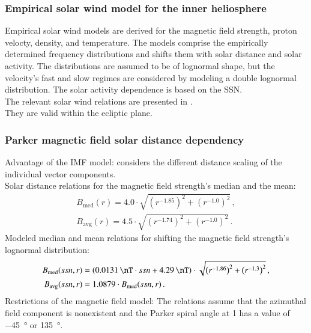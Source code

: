 \subsubsection*{Empirical solar wind model for the inner heliosphere}

Empirical solar wind models are derived for the magnetic field strength, proton velocty, density, and temperature. The models comprise the empirically determined frequency distributions and shifts them with solar distance and solar activity. The distributions are assumed to be of lognormal shape, but the velocity's fast and slow regimes are considered by modeling a double lognormal distribution. The solar activity dependence is based on the SSN.\\

The relevant solar wind relations are presented in \citet[p.~10]{Venzmer2018}.\\
They are valid within the ecliptic plane.\\


\subsubsection*{Parker magnetic field solar distance dependency}
Advantage of the IMF model: considers the different distance scaling of the individual vector components.\\

Solar distance relations for the magnetic field strength's median and the mean:
\begin{align}
	B_\text{med}(r) = 4.0 \cdot \sqrt{\left(r^{-1.85}\right)^2 + \left(r^{-1.0}\right)^2}	\,,\\
	B_\text{avg}(r) = 4.5 \cdot \sqrt{\left(r^{-1.74}\right)^2 + \left(r^{-1.0}\right)^2}	\,.
\end{align}
Modeled median and mean relations for shifting the magnetic field strength's lognormal distribution:
\begin{align}
	B_\text{med}(ssn,r) &= \left(\SI{0.0131}{\nT} \cdot ssn + \SI{4.29}{\nT}\right) \cdot \sqrt{\left(r^{-1.86}\right)^2 + \left(r^{-1.3}\right)^2}	\,,\\
	B_\text{avg}(ssn,r) &= 1.0879 \cdot B_\text{med}(ssn,r)	\,.
\end{align}
Restrictions of the magnetic field model: The relations assume that the azimuthal field component is nonexistent and the Parker spiral angle at \SI{1}{\au} has a value of \SI{-45}{\degree} or \SI{135}{\degree}.\\

